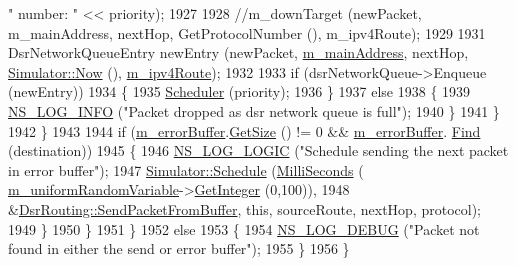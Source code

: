\begin{DoxyCode}
{      " number: "} << priority);
1927 
1928                   \textcolor{comment}{//m\_downTarget (newPacket, m\_mainAddress, nextHop, GetProtocolNumber (), m\_ipv4Route);}
1929 
1931                  DsrNetworkQueueEntry newEntry (newPacket, \hyperlink{classns3_1_1dsr_1_1DsrRouting_a73182b5edee2d8460f28855e058fc9a0}{m\_mainAddress}, nextHop, 
      \hyperlink{classns3_1_1Simulator_ac3178fa975b419f7875e7105be122800}{Simulator::Now} (), \hyperlink{classns3_1_1dsr_1_1DsrRouting_ab4c16d56044159989e52ad33c0afed2b}{m\_ipv4Route});
1932 
1933                  \textcolor{keywordflow}{if} (dsrNetworkQueue->Enqueue (newEntry))
1934                    \{
1935                      \hyperlink{classns3_1_1dsr_1_1DsrRouting_aa518edb174bccce1062304404424c6e0}{Scheduler} (priority);
1936                    \}
1937                  \textcolor{keywordflow}{else}
1938                    \{
1939                      \hyperlink{group__logging_gafbd73ee2cf9f26b319f49086d8e860fb}{NS\_LOG\_INFO} (\textcolor{stringliteral}{"Packet dropped as dsr network queue is full"});
1940                    \}
1941                 \}
1942             \}
1943 
1944           \textcolor{keywordflow}{if} (\hyperlink{classns3_1_1dsr_1_1DsrRouting_a802e15bf588fd1e9ccd401221461397a}{m\_errorBuffer}.\hyperlink{classns3_1_1dsr_1_1DsrErrorBuffer_ab92dc271abcc1543af60225e3bde0469}{GetSize} () != 0 && \hyperlink{classns3_1_1dsr_1_1DsrRouting_a802e15bf588fd1e9ccd401221461397a}{m\_errorBuffer}.
      \hyperlink{classns3_1_1dsr_1_1DsrErrorBuffer_a6297a3549b5a22b7a71f7ffe44323b0e}{Find} (destination))
1945             \{
1946               \hyperlink{group__logging_ga88acd260151caf2db9c0fc84997f45ce}{NS\_LOG\_LOGIC} (\textcolor{stringliteral}{"Schedule sending the next packet in error buffer"});
1947               \hyperlink{classns3_1_1Simulator_a671882c894a08af4a5e91181bf1eec13}{Simulator::Schedule} (\hyperlink{group__timecivil_gaf26127cf4571146b83a92ee18679c7a9}{MilliSeconds} (
      \hyperlink{classns3_1_1dsr_1_1DsrRouting_a22a85b3510166ffdd451e4010f996f0f}{m\_uniformRandomVariable}->\hyperlink{classns3_1_1RandomVariableStream_a66cd94e6305ce7f000f1a9ff0fcb9aef}{GetInteger} (0,100)),
1948                                    &\hyperlink{classns3_1_1dsr_1_1DsrRouting_a1a862a16f3a5527f9425763864ac3e80}{DsrRouting::SendPacketFromBuffer}, \textcolor{keyword}{this},
       sourceRoute, nextHop, protocol);
1949             \}
1950         \}
1951     \}
1952   \textcolor{keywordflow}{else}
1953     \{
1954       \hyperlink{group__logging_ga413f1886406d49f59a6a0a89b77b4d0a}{NS\_LOG\_DEBUG} (\textcolor{stringliteral}{"Packet not found in either the send or error buffer"});
1955     \}
1956 \}
\end{DoxyCode}



